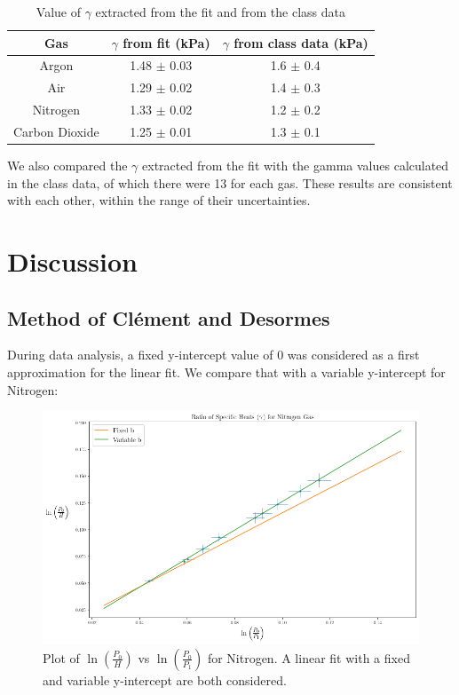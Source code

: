 \documentclass[12pt]{article}
\begin{document}
\begin{center}
\begin{table}[H]	
\begin{tabular}{c | c | c}
	Gas & $\gamma$ from fit (kPa) & $\gamma$ from class data (kPa)\\
	\hline
	Argon & 1.48 $\pm$ 0.03 & 1.6 $\pm$ 0.4 \\
	Air & 1.29 $\pm$ 0.02 & 1.4 $\pm$ 0.3\\
	Nitrogen & 1.33 $\pm$ 0.02 & 1.2 $\pm$ 0.2\\
	Carbon Dioxide & 1.25 $\pm$ 0.01 & 1.3 $\pm$ 0.1\\
\end{tabular}
\caption{Value of $\gamma$ extracted from the fit and from the class data}
\end{table}
\end{center}

We also compared the $\gamma$ extracted from the fit with the gamma values calculated in the class data, of which there were 13 for each gas. These results are consistent with each other, within the range of their uncertainties.
\section{Discussion}
\subsection{Method of Clément and Desormes}
During data analysis, a fixed y-intercept value of 0 was considered as a first approximation for the linear fit. We compare that with a variable y-intercept for Nitrogen:
\begin{figure}[h]
	\includegraphics[width=1\textwidth]{Figures/Clement_N}
	\caption{Plot of $\ln \left( \frac{{P_0}}{{H}} \right)$ vs $\ln \left( \frac{{P_0}}{{P_1}} \right)$ for Nitrogen. A linear fit with a fixed and variable y-intercept are both considered.}
\end{figure}
\end{document}
